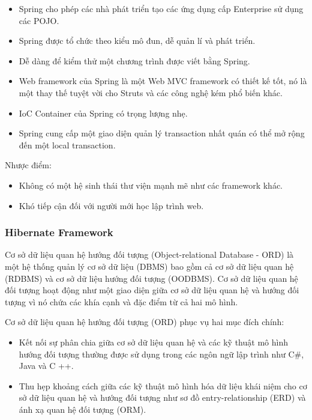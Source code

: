 \begin{itemize}
    \item Spring cho phép các nhà phát triển tạo các ứng dụng cấp Enterprise sử dụng các POJO. 
    \item Spring được tổ chức theo kiểu mô đun, dễ quản lí và phát triển.
    \item Dễ dàng để kiểm thử một chương trình được viết bằng Spring.
    \item Web framework của Spring là một Web MVC framework có thiết kế tốt, nó là một thay thế tuyệt vời cho Struts và các công nghệ kém phổ biến khác.
    \item IoC Container của Spring có trọng lượng nhẹ.
    \item Spring cung cấp một giao diện quản lý transaction nhất quán có thể mở rộng đến một local transaction.
\end{itemize}
Nhược điểm:
\begin{itemize}
    \item Không có một hệ sinh thái thư viện mạnh mẽ như các framework khác.
    \item Khó tiếp cận đối với người mới học lập trình web.
\end{itemize}

\subsubsection{Hibernate Framework}
Cơ sở dữ liệu quan hệ hướng đối tượng (Object-relational Database - ORD) là một hệ thống quản lý cơ sở dữ liệu (DBMS) bao gồm cả cơ sở dữ liệu quan hệ (RDBMS) và cơ sở dữ liệu hướng đối tượng (OODBMS). Cơ sở dữ liệu quan hệ đối tượng hoạt động như một giao diện giữa cơ sở dữ liệu quan hệ và hướng đối tượng vì nó chứa các khía cạnh và đặc điểm từ cả hai mô hình.\par

Cơ sở dữ liệu quan hệ hướng đối tượng (ORD) phục vụ hai mục đích chính:
\begin{itemize}
    \item Kết nối sự phân chia giữa cơ sở dữ liệu quan hệ và các kỹ thuật mô hình hướng đối tượng thường được sử dụng trong các ngôn ngữ lập trình như C\#, Java và C ++.
    \item Thu hẹp khoảng cách giữa các kỹ thuật mô hình hóa dữ liệu khái niệm cho cơ sở dữ liệu quan hệ và hướng đối tượng như sơ đồ entry-relationship (ERD) và ánh xạ quan hệ đối tượng (ORM).
\end{itemize}

